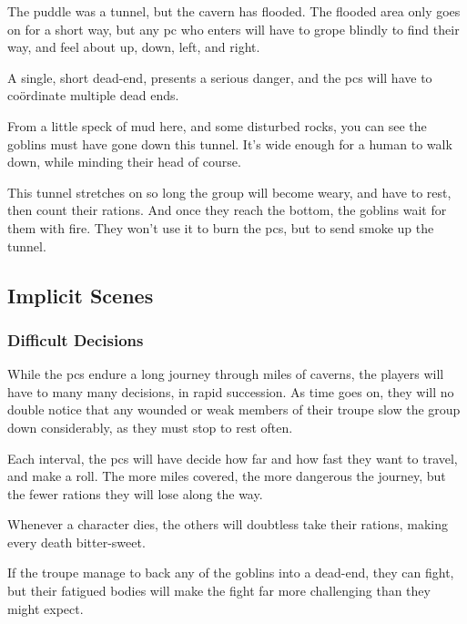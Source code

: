 \begin{multicols}{2}
\noindent
The puddle was a tunnel, but the cavern has flooded.
The flooded area only goes on for a short way, but any \gls{pc} who enters will have to grope blindly to find their way, and feel about up, down, left, and right.

A single, short dead-end, presents a serious danger, and the \glspl{pc} will have to co\"{o}rdinate multiple dead ends.

\begin{boxtext}
  From a little speck of mud here, and some disturbed rocks, you can see the goblins must have gone down this tunnel.
  It's wide enough for a human to walk down, while minding their head of course.
\end{boxtext}

\noindent
This tunnel stretches on so long the group will become weary, and have to rest, then count their rations.
And once they reach the bottom, the goblins wait for them with fire.
They won't use it to burn the \glspl{pc}, but to send smoke up the tunnel.

\subsection{Implicit Scenes}

\subsubsection{Difficult Decisions}

While the \glspl{pc} endure a long journey through miles of caverns, the players will have to many many decisions, in rapid succession.
As time goes on, they will no double notice that any wounded or weak members of their troupe slow the group down considerably, as they must stop to rest often.

\iftoggle{core}{\caveTravelChart}{}
Each \gls{interval}, the \glspl{pc} will have decide how far and how fast they want to travel, and make a  roll.
The more miles covered, the more dangerous the journey, but the fewer rations they will lose along the way.%

Whenever a character dies, the others will doubtless take their rations, making every death bitter-sweet.

If the troupe manage to back any of the goblins into a dead-end, they can fight, but their fatigued bodies will make the fight far more challenging than they might expect.


\end{multicols}
